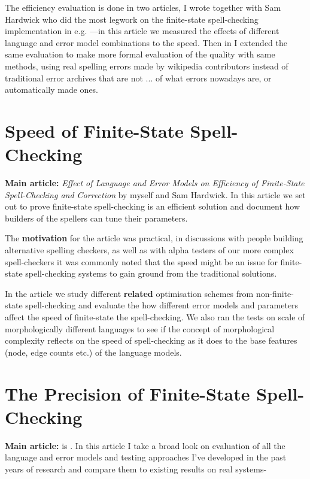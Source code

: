 \documentclass[officiallayout]{unihelcompling}
\begin{document}
The efficiency evaluation is done in two articles, \citep{pirinen2012effects} I
wrote together with Sam Hardwick who did the most legwork on the finite-state
spell-checking implementation in e.g. \citep{linden2011hfst}---in this article
we measured the effects of different language and error model combinations to
the speed. Then in \citep{pirinen2013quality} I extended the same evaluation to
make more formal evaluation of the quality with same methods, using real
spelling errors made by wikipedia contributors instead of traditional error
archives that are not ...  of what errors nowadays are, or automatically made
ones.

\section{Speed of Finite-State Spell-Checking}

\textbf{Main article:} \emph{Effect of Language and Error Models on Efficiency
of Finite-State Spell-Checking and Correction} by myself and Sam Hardwick. In
this article we set out to prove finite-state spell-checking is an efficient
solution and document how builders of the spellers can tune their parameters.

The \textbf{motivation} for the article was practical, in discussions with
people building alternative spelling checkers, as well as with alpha testers of
our more complex spell-checkers it was commonly noted that the speed might be
an issue for finite-state spell-checking systems to gain ground from the
traditional solutions. 

In the article we study different \textbf{related} optimisation schemes from
non-finite-state spell-checking and evaluate the how different error models and
parameters affect the speed of finite-state the spell-checking. We also ran the
tests on scale of morphologically different languages to see if the concept of
morphological complexity reflects on the speed of spell-checking as it does to
the base features (node, edge counts etc.) of the language models.

\section{The Precision of Finite-State Spell-Checking}

\textbf{Main article:} is . In this article I take a broad
look on evaluation of all the language and error models and testing approaches
I've developed in the past years of research and compare them to existing
results on real systems-
\end{document}
